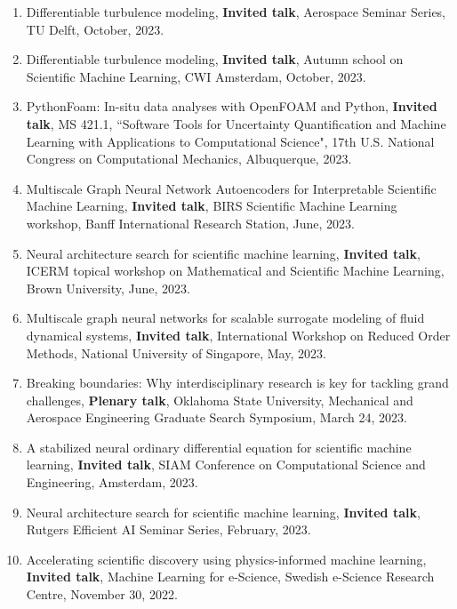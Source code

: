 \documentclass[letterpaper]{article}
\begin{document}
\begin{enumerate}
\item Differentiable turbulence modeling, \textbf{Invited talk}, Aerospace Seminar Series, TU Delft, October, 2023.

\item Differentiable turbulence modeling, \textbf{Invited talk}, Autumn school on Scientific Machine Learning, CWI Amsterdam, October, 2023.

\item PythonFoam: In-situ data analyses with OpenFOAM and Python, \textbf{Invited talk}, MS 421.1, ``Software Tools for Uncertainty Quantification and Machine Learning with Applications to Computational Science", 17th U.S. National Congress on Computational Mechanics, Albuquerque, 2023.

\item Multiscale Graph Neural Network Autoencoders for Interpretable Scientific Machine Learning, \textbf{Invited talk}, BIRS Scientific Machine Learning workshop, Banff International Research Station, June, 2023.

\item Neural architecture search for scientific machine learning, \textbf{Invited talk}, ICERM topical workshop on Mathematical and Scientific Machine Learning, Brown University, June, 2023.

\item Multiscale graph neural networks for scalable surrogate modeling of fluid dynamical systems, \textbf{Invited talk}, International Workshop on Reduced Order Methods, National University of Singapore, May, 2023.

\item Breaking boundaries: Why interdisciplinary research is key for tackling grand challenges, \textbf{Plenary talk}, Oklahoma State University, Mechanical and Aerospace Engineering Graduate Search Symposium, March 24, 2023.

\item A stabilized neural ordinary differential equation for scientific machine learning, \textbf{Invited talk}, SIAM Conference on Computational Science and Engineering, Amsterdam, 2023.

\item Neural architecture search for scientific machine learning, \textbf{Invited talk}, Rutgers Efficient AI Seminar Series, February, 2023.

\item Accelerating scientific discovery using physics-informed machine learning, \textbf{Invited talk}, Machine Learning for e-Science, Swedish e-Science Research Centre, November 30, 2022.


\end{enumerate}
\end{document}
